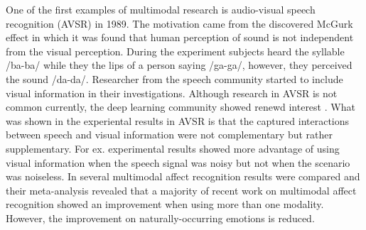 One of the first examples of multimodal research is audio-visual speech recognition (AVSR) in 1989. The motivation came from the discovered McGurk effect in which it was found that human perception of sound is not independent from the visual perception. During the experiment subjects heard the syllable /ba-ba/ while they the lips of a person saying /ga-ga/, however, they perceived the sound /da-da/. Researcher from the speech community started to include visual information in their investigations. Although research in AVSR is not common currently, the deep learning community showed renewd interest \cite{Ngiam2011}. What was shown in the experiental results in AVSR is that the captured interactions between speech and visual information were not complementary but rather supplementary. For ex. experimental results showed more advantage of using visual information when the speech signal was noisy but not when the scenario was noiseless.
In \cite{Dmello2015review} several multimodal affect recognition results were compared and their meta-analysis revealed that a majority of recent work on multimodal affect recognition showed an improvement when using more than one modality. However, the improvement on naturally-occurring emotions is reduced. 

